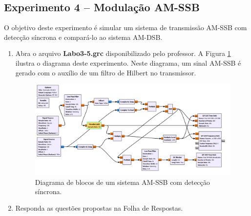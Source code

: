 \documentclass[12pt,addpoints]{exam}
\newcommand{\myscale}{0.4}
\begin{document}
%
%

\subsection{Experimento 4 -- Modulação AM-SSB}

O objetivo deste experimento é simular um sistema de transmissão AM-SSB com detecção síncrona e compará-lo ao sistema AM-DSB.

\begin{enumerate}
    \item  Abra o arquivo \textbf{Labo3-5.grc} disponibilizado pelo professor. A Figura \ref{fig:GRC_3-5} ilustra o diagrama deste experimento. Neste diagrama, um sinal AM-SSB é gerado com o auxílio de um filtro de Hilbert no transmissor.
    \begin{figure}[htb]
        \centering
        \includegraphics[scale=\myscale]{./Figuras/Labo3-5}
        \caption{Diagrama de blocos de um sistema AM-SSB com detecção síncrona.} 
        \label{fig:GRC_3-5}
    \end{figure}
  \item Responda as questões propostas na Folha de Respostas.
\end{enumerate}
\end{document}
